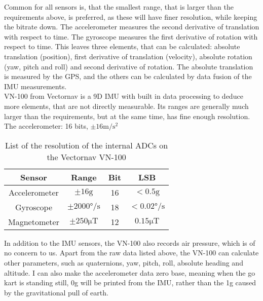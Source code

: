 Common for all sensors is, that the smallest range, that is larger than the requirements above, is preferred, as these will have finer resolution, while keeping the bitrate down.
The accelerometer measures the second derivative of translation with respect to time. 
The gyroscope measures the first derivative of rotation with respect to time.
This leaves three elements, that can be calculated: absolute translation (position), first derivative of translation (velocity), absolute rotation (yaw, pitch and roll) and second derivative of rotation.
The absolute translation is measured by the GPS, and the others can be calculated by data fusion of the IMU measurements.\\

VN-100 from Vectornav is a 9D IMU with built in data processing to deduce more elements, that are not directly measurable.
Its ranges are generally much larger than the requirements, but at the same time, has fine enough resolution.
The accelerometer: 16 bits,  $\pm 16 \si{\meter \per \second \squared}$

\begin{table}
	\centering
	\begin{tabular}{ c | c c c}
		{\textbf{Sensor}} & {\textbf{Range}} & {\textbf{Bit}} & {\textbf{LSB}}\\
		\hline
		{Accelerometer}	& { $\pm 16 \mathrm{g}$}					& {16}	& {$< 0.5 \mathrm{g}$}\\
		{Gyroscope}		& { $\pm 2000\si{\degree \per \second}$ }	& {18}	& {$<0.02 \si{\degree \per \second}$}\\
		{Magnetometer}	& { $\pm 250 \si{\micro \tesla}$}			& {12}	& {$0.15 \si{\micro \tesla}$}
	\end{tabular}
	\caption{List of the resolution of the internal ADCs on the Vectornav VN-100}
	\label{tab:vectornav_measurement_resolution}
\end{table}

In addition to the IMU sensors, the VN-100 also records air pressure, which is of no concern to us.
Apart from the raw data listed above, the VN-100 can calculate other parameters, such as quaternions, yaw, pitch, roll, absolute heading and altitude.
I can also make the accelerometer data zero base, meaning when the go kart is standing still, 0g will be printed from the IMU, rather than the 1g caused by the gravitational pull of earth. \\

